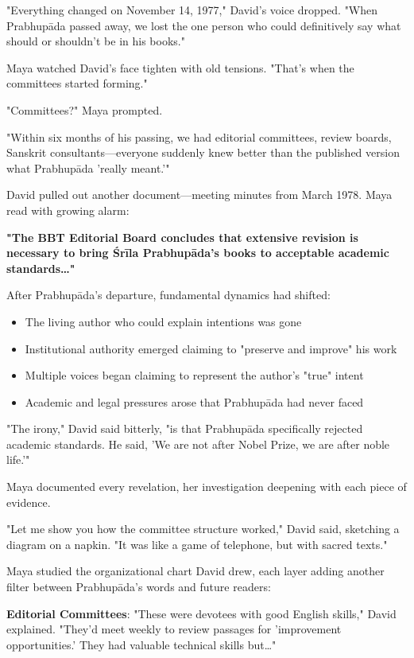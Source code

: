 \documentclass[12pt,twoside]{book}
\begin{document}
"Everything changed on November 14, 1977," David's voice dropped. "When Prabhupāda passed away, we lost the one person who could definitively say what should or shouldn't be in his books."

Maya watched David's face tighten with old tensions. "That's when the committees started forming."

"Committees?" Maya prompted.

"Within six months of his passing, we had editorial committees, review boards, Sanskrit consultants—everyone suddenly knew better than the published version what Prabhupāda 'really meant.'"

David pulled out another document—meeting minutes from March 1978. Maya read with growing alarm:

\textbf{"The BBT Editorial Board concludes that extensive revision is necessary to bring Śrīla Prabhupāda's books to acceptable academic standards\ldots{}"}

After Prabhupāda's departure, fundamental dynamics had shifted:
\begin{itemize}
\item The living author who could explain intentions was gone
\item Institutional authority emerged claiming to "preserve and improve" his work
\item Multiple voices began claiming to represent the author's "true" intent
\item Academic and legal pressures arose that Prabhupāda had never faced
\end{itemize}

"The irony," David said bitterly, "is that Prabhupāda specifically rejected academic standards. He said, 'We are not after Nobel Prize, we are after noble life.'"

Maya documented every revelation, her investigation deepening with each piece of evidence.


"Let me show you how the committee structure worked," David said, sketching a diagram on a napkin. "It was like a game of telephone, but with sacred texts."

Maya studied the organizational chart David drew, each layer adding another filter between Prabhupāda's words and future readers:

\textbf{\textbf{Editorial Committees}}: "These were devotees with good English skills," David explained. "They'd meet weekly to review passages for 'improvement opportunities.' They had valuable technical skills but\ldots{}"
\end{document}
